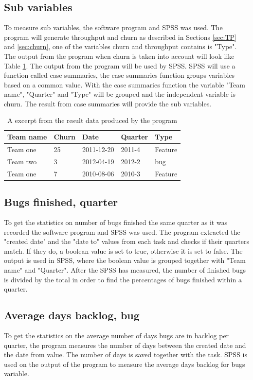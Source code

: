 \documentclass[UKenglish]{ifimaster}  %
\begin{document}
\subsection {Sub variables}
\label{sec:bug}
To measure sub variables, the software program and SPSS was used. The program will generate throughput and churn as described in Sections \ref{sec:TP} and \ref{sec:churn}, one of the variables churn and throughput contains is "Type". The output from the program  when churn is taken into account will look like Table \ref{tab:ftb}. The output from the program will be used by SPSS. SPSS will use a function called case summaries, the case summaries function groups variables based on a common value.  With the case summaries function the variable "Team name", "Quarter" and "Type" will be grouped and the independent variable is churn. The result from case summaries will provide the sub variables.

\begin{table}[!ht]
\center
\begin{tabular}{ | l | l | l | l | l | }
\hline
	\bf{Team name} & \bf{Churn} & \bf{Date} & \bf{Quarte}r & \bf{Type} \\ \hline
	Team one & 25 &2011-12-20& 2011-4 & Feature \\ \hline
	Team two & 3 &2012-04-19 & 2012-2 & bug \\ \hline
	Team one & 7 & 2010-08-06 & 2010-3 & Feature \\ \hline
\end{tabular}
\caption{A excerpt from the result data produced by the program }
\label{tab:ftb} 
\end{table}

\subsection{Bugs finished, quarter}
\label{sub:sec:bfq} 
To get the statistics on number of bugs finished the same quarter as it was recorded the software program and SPSS was used. The program extracted the "created date" and the "date to" values from each task and checks if their quarters match. If they do, a boolean value is set to true, otherwise it is set to false. The output is used in SPSS, where the boolean value is grouped together with "Team name" and "Quarter". After the SPSS has measured, the number of finished bugs is divided by the total in order to find the percentages of bugs finished within a quarter. 
\subsection{Average days backlog, bug}
\label{sub:sec:adbb}
To get the statistics on the average number of days bugs are in backlog per quarter, the program measures the number of days between the created date and the date from value. The number of days is saved together with the task. SPSS is used on the output of the program to measure the average days backlog for bugs variable.
\end{document}
